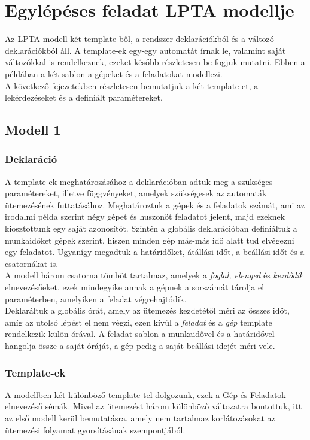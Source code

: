 \documentclass {report}
\begin{document}
  

\chapter{Egylépéses feladat LPTA modellje}
    Az LPTA modell két template-ből, a rendszer deklarációkból és a változó deklarációkból áll. A template-ek egy-egy automatát írnak le, valamint saját változókkal is rendelkeznek, ezeket később részletesen be fogjuk mutatni. Ebben a példában a két sablon a gépeket és a feladatokat modellezi.\\
    A következő fejezetekben részletesen bemutatjuk a két template-et, a lekérdezéseket és a definiált paramétereket.
    \section{Modell 1}
    \subsection{Deklaráció}
     A template-ek meghatározásához a deklarációban adtuk meg a szükséges paramétereket, illetve függvényeket, amelyek szükségesek az automaták ütemezésének futtatásához. Meghatároztuk a gépek és a feladatok számát, ami az irodalmi példa szerint négy gépet és huszonöt feladatot jelent, majd ezeknek kiosztottunk egy saját azonosítót. Szintén a globális deklarációban definiáltuk a munkaidőket gépek szerint, hiszen minden gép más-más idő alatt tud elvégezni egy feladatot. Ugyanígy megadtuk a határidőket, átállási időt, a beállási időt és a csatornákat is.\\
     A modell három csatorna tömböt tartalmaz, amelyek a \emph{foglal, elenged} és \emph{kezdődik} elnevezésűeket, ezek mindegyike annak a gépnek a sorszámát tárolja el paraméterben, amelyiken a feladat végrehajtódik.\\ 
      Deklaráltuk a globális órát, amely az ütemezés kezdetétől méri az összes időt, amíg az utolsó lépést el nem végzi, ezen kívül a \emph{feladat} és a \emph{gép} template rendelkezik külön órával. A feladat sablon a munkaidővel és a határidővel hangolja össze a saját óráját, a gép pedig a saját beállási idejét méri vele. 
    \subsection{Template-ek}
    A modellben két különböző template-tel dolgozunk, ezek a Gép és Feladatok elnevezésű sémák. Mivel az ütemezést három különböző változatra bontottuk, itt az első modell kerül bemutatásra, amely nem tartalmaz korlátozásokat az ütemezési folyamat gyorsításának szempontjából.\\
\end{document}

